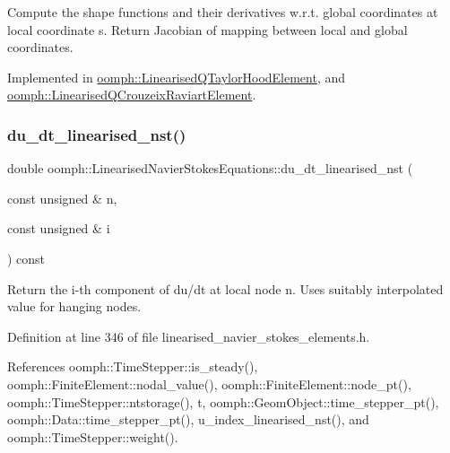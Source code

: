 Compute the shape functions and their derivatives w.\+r.\+t. global coordinates at local coordinate s. Return Jacobian of mapping between local and global coordinates. 



Implemented in \hyperlink{classoomph_1_1LinearisedQTaylorHoodElement_ae6cdd6036b58e98ddabffddb645270be}{oomph\+::\+Linearised\+Q\+Taylor\+Hood\+Element}, and \hyperlink{classoomph_1_1LinearisedQCrouzeixRaviartElement_aa6112ad393ddc9e9a3639eef554173d0}{oomph\+::\+Linearised\+Q\+Crouzeix\+Raviart\+Element}.

\mbox{\label{classoomph_1_1LinearisedNavierStokesEquations_a66bb2c6c61f3922d8aa05cce128d1bd1}} 
\subsubsection{\texorpdfstring{du\+\_\+dt\+\_\+linearised\+\_\+nst()}{du\_dt\_linearised\_nst()}}
{\footnotesize\ttfamily double oomph\+::\+Linearised\+Navier\+Stokes\+Equations\+::du\+\_\+dt\+\_\+linearised\+\_\+nst (\begin{DoxyParamCaption}\item[{const unsigned \&}]{n,  }\item[{const unsigned \&}]{i }\end{DoxyParamCaption}) const\hspace{0.3cm}{\ttfamily [inline]}}



Return the i-\/th component of du/dt at local node n. Uses suitably interpolated value for hanging nodes. 



Definition at line 346 of file linearised\+\_\+navier\+\_\+stokes\+\_\+elements.\+h.



References oomph\+::\+Time\+Stepper\+::is\+\_\+steady(), oomph\+::\+Finite\+Element\+::nodal\+\_\+value(), oomph\+::\+Finite\+Element\+::node\+\_\+pt(), oomph\+::\+Time\+Stepper\+::ntstorage(), t, oomph\+::\+Geom\+Object\+::time\+\_\+stepper\+\_\+pt(), oomph\+::\+Data\+::time\+\_\+stepper\+\_\+pt(), u\+\_\+index\+\_\+linearised\+\_\+nst(), and oomph\+::\+Time\+Stepper\+::weight().

